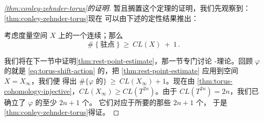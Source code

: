 \begin{proof}[\cref*{thm:conley-zehnder-torus}的证明]
暂且搁置这个定理的证明，我们先观察到：\cref{thm:conley-zehnder-torus}现在%
可以由下述\trDynamicalSystem{}的定性结果推出：

\begin{theorem}[\trLjusternik-\trSchnirelman]\label{thm:rest-point-estimate}
考虑\trCompact{}度量空间 $X$ 上的一个连续\trGradientLike\trFlow；那么
\[
\#\ \{\ \text{驻点}\ \}\ \geq\ CL(X)\ +\ 1\,.
\]
\end{theorem}

我们将在下一节中证明\cref{thm:rest-point-estimate}，那一节专门讨论%
\trLjusternik-\trSchnirelman{}理论。回顾 $\varphi$ 的\trCriticalPoint{}就是%
\trGradientLike\trFlow{} \eqref{eq:torus-shift-action} 的\trRestPoint，把%
\cref{thm:rest-point-estimate} 应用到\trCompact{}空间 $X=X_{\infty}$，我们便%
得出 $\#\{\varphi$ 的\trCriticalPoint$\}\ \geq\ CL(X_{\infty})+1$。现在由%
\cref{thm:torus-cohomology-injective}，$CL(X_{\infty})\geq CL(T^{2n})$。由于%
$CL(T^{2n})=2n$，我们已确立了 $\varphi$ 的至少 $2n+1$ 个\trCriticalPoint。%
它们对应于\trHamiltonianVectorField{}所要的那些 $2n+1$ 个\trPeriodicSolution，%
于是\cref{thm:conley-zehnder-torus}得证。
\end{proof}

